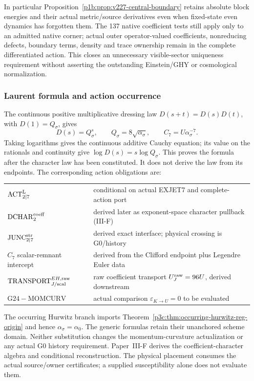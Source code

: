 \documentclass[12pt,a4paper]{article}
\begin{document}
In particular Proposition~\ref{p1b:prop:v227-central-boundary} retains
absolute block energies and their actual metric/source derivatives even
when fixed-state even dynamics has forgotten them. The 137 native
coefficient tests still apply only to an admitted native corner; actual
outer operator-valued coefficients, nonreducing defects, boundary terms,
density and trace ownership remain in the complete differentiated action.
This closes an unnecessary visible-sector uniqueness requirement without
asserting the outstanding Einstein/GHY or cosmological normalization.


\subsubsection{Laurent formula and action occurrence}

\begin{remark}
\label{p3e:rem:laurent-claim-owner-partition}
The continuous positive multiplicative dressing law
\(D(s+t)=D(s)D(t)\), with \(D(1)=Q_\sigma\), gives
\[
 D(s)=Q_\sigma^s,\qquad
 Q_\sigma=8\sqrt{\alpha_\sigma},\qquad
 C_7=U\alpha_\sigma^{-7}.
\]
Taking logarithms gives the continuous additive Cauchy equation;
its value on the rationals and continuity give
\(\log D(s)=s\log Q_\sigma\).  This proves the formula after the
character law has been constituted.  It does not derive the law
from its endpoints.  The corresponding action obligations are:
\par\medskip
\noindent\begin{tabular}{@{}p{.38\linewidth}p{.57\linewidth}@{}}
\(\mathrm{ACT}_{2|7}^{\rm L}\) & conditional on actual EXJET7 and complete-action port\\
\(\mathrm{DCHAR}_2^{\rm coeff}\) & derived later as exponent-space character pullback (III-F)\\
\(\mathrm{JUNC}_{2|7}^{\rm str}\) & derived exact interface; physical crossing is G0/history\\
\(C_7\) scalar-remnant intercept & derived from the Clifford endpoint plus Legendre Euler data\\
\(\mathrm{TRANSPORT}_{J/\mathrm{scal}}^{EH,\rm raw}\)
  & raw coefficient transport \(U_J^{\rm raw}=96U\), derived downstream\\
\(\mathrm{G24\!\!-\!MOMCURV}\)
  & actual comparison \(\varepsilon_{K\to U}=0\) to be evaluated
\end{tabular}\par\medskip
The occurring Hurwitz branch imports
Theorem~\ref{p3c:thm:occurring-hurwitz-reg-origin} and hence
\(\alpha_\sigma=\alpha_0\).  The generic formulas retain their
unanchored scheme domain.  Neither substitution changes the momentum-curvature actualization or any actual G0 history requirement.  Paper~III-F derives the coefficient-character algebra and conditional
reconstruction. The physical placement consumes the actual source/owner
certificates; a supplied susceptibility alone does not evaluate them.
\end{remark}
\end{document}
